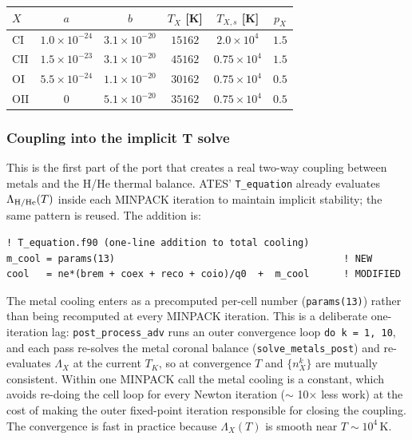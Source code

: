 \documentclass[english,a4paper]{kiseon_memo}
\begin{document}
\begin{center}
\small
\begin{tabular}{|l|c|c|c|c|c|}
\hline
$X$  & $a$ & $b$ & $T_X$ [K] & $T_{X,s}$ [K] & $p_X$ \\
\hline
CI   & $1.0\times 10^{-24}$ & $3.1\times 10^{-20}$ & $15162$ & $2.0\times 10^4$ & $1.5$ \\
CII  & $1.5\times 10^{-23}$ & $3.1\times 10^{-20}$ & $45162$ & $0.75\times 10^4$ & $1.5$ \\
OI   & $5.5\times 10^{-24}$ & $1.1\times 10^{-20}$ & $30162$ & $0.75\times 10^4$ & $0.5$ \\
OII  & $0$                  & $5.1\times 10^{-20}$ & $35162$ & $0.75\times 10^4$ & $0.5$ \\
\hline
\end{tabular}
\end{center}

\subsubsection*{Coupling into the implicit T solve}

This is the first part of the port that creates a real two-way coupling
between metals and the H/He thermal balance. ATES' \texttt{T\_equation}
already evaluates $\Lambda_{\rm H/He}(T)$ inside each MINPACK iteration
to maintain implicit stability; the same pattern is reused. The
addition is:

\begin{verbatim}
! T_equation.f90 (one-line addition to total cooling)
m_cool = params(13)                                        ! NEW
cool   = ne*(brem + coex + reco + coio)/q0  +  m_cool      ! MODIFIED
\end{verbatim}

The metal cooling enters as a precomputed per-cell number
(\texttt{params(13)}) rather than being recomputed at every MINPACK
iteration. This is a deliberate one-iteration lag: \texttt{post\_process\_adv}
runs an outer convergence loop \texttt{do k = 1, 10}, and each pass
re-solves the metal coronal balance (\texttt{solve\_metals\_post}) and
re-evaluates $\Lambda_X$ at the current $T_K$, so at convergence
$T$ and $\{n_X^k\}$ are mutually consistent. Within one MINPACK call
the metal cooling is a constant, which avoids re-doing the cell loop
for every Newton iteration ($\sim$ 10$\times$ less work) at the cost of
making the outer fixed-point iteration responsible for closing the
coupling. The convergence is fast in practice because $\Lambda_X(T)$
is smooth near $T \sim 10^4\,$K.
\end{document}
